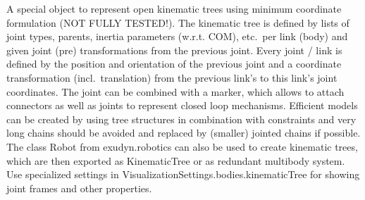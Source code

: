 \label{sec:item:ObjectKinematicTree}
A special object to represent open kinematic trees using minimum coordinate formulation (NOT FULLY TESTED!). The kinematic tree is defined by lists of joint types, parents, inertia parameters (w.r.t. COM), etc.\ per link (body) and given joint (pre) transformations from the previous joint. Every joint / link is defined by the position and orientation of the previous joint and a coordinate transformation (incl.\ translation) from the previous link's to this link's joint coordinates. The joint can be combined with a marker, which allows to attach connectors as well as joints to represent closed loop mechanisms. Efficient models can be created by using tree structures in combination with constraints and very long chains should be avoided and replaced by (smaller) jointed chains if possible. The class Robot from exudyn.robotics can also be used to create kinematic trees, which are then exported as KinematicTree or as redundant multibody system. Use specialized settings in VisualizationSettings.bodies.kinematicTree for showing joint frames and other properties.
\vspace{12pt}\\

